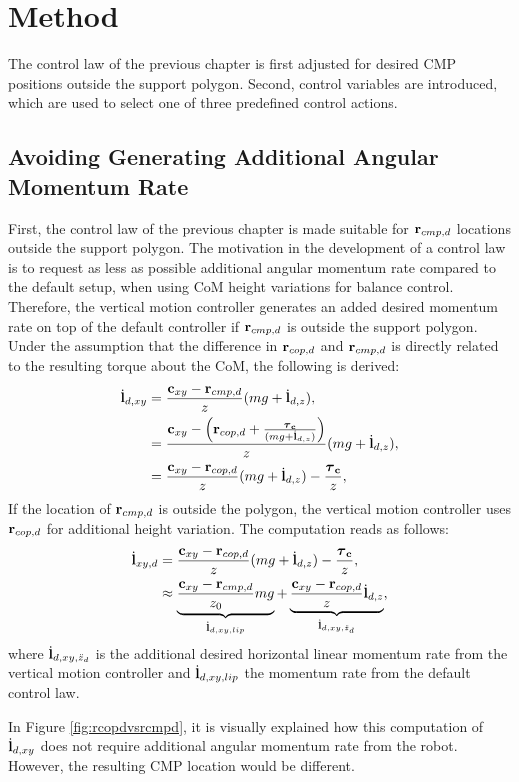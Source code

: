 \section{Method}
The control law of the previous chapter is first adjusted for desired \ac{CMP} positions outside the support polygon. Second, control variables are introduced, which are used to select one of three predefined control actions.

\subsection{Avoiding Generating Additional Angular Momentum Rate}
First, the control law of the previous chapter is made suitable for $\mathbf{r}_{cmp,d}$ locations outside the support polygon. The motivation in the development of a control law is to request as less as possible additional angular momentum rate compared to the default setup, when using \ac{CoM} height variations for balance control. Therefore, the vertical motion controller generates an added desired momentum rate on top of the default controller if $\mathbf{r}_{cmp,d}$ is outside the support polygon. Under the assumption that the difference in $\mathbf{r}_{cop,d}$ and $\mathbf{r}_{cmp,d}$ is directly related to the resulting torque about the \ac{CoM}, the following is derived:
\begin{align}
    \dot{\mathbf{l}}_{d,xy} &= \frac{\mathbf{c}_{xy}-\mathbf{r}_{cmp,d}}{z}(mg+\dot{\mathbf{l}}_{d,z}),\\
&=\frac{\mathbf{c}_{xy}-\Big(\mathbf{r}_{cop,d}+\frac{\boldsymbol{\tau}_{\mathbf{c}}}{(mg+\dot{\mathbf{l}}_{d,z})}\Big)}{z}(mg+\dot{\mathbf{l}}_{d,z}), \\
&=\frac{\mathbf{c}_{xy}-\mathbf{r}_{cop,d}}{z}(mg + \dot{\mathbf{l}}_{d,z})- \frac{\boldsymbol{\tau}_{\mathbf{c}}}{z},
\end{align}
If the location of $\mathbf{r}_{cmp,d}$ is outside the polygon, the vertical motion controller uses $\mathbf{r}_{cop,d}$ for additional height variation. The computation reads as follows:
 \begin{align}
\dot{\mathbf{l}}_{xy,d}&=\frac{\mathbf{c}_{xy}-\mathbf{r}_{cop,d}}{z}(mg+\dot{\mathbf{l}}_{d,z}) - \frac{\boldsymbol{\tau}_{\mathbf{c}}}{z},\\
&\approx \underbrace{ \frac{\mathbf{c}_{xy}-\mathbf{r}_{cmp,d}} {z_0}mg}_{\dot{\mathbf{l}}_{d,xy,lip}}  + \underbrace{\frac{\mathbf{c}_{xy}-\mathbf{r}_{cop,d}}{z}\dot{\mathbf{l}}_{d,z}}_{\dot{\mathbf{l}}_{d,xy,\ddot{z}_d}},
\end{align}
where $\dot{\mathbf{l}}_{d,xy,\ddot{z}_d}$ is the additional desired horizontal linear momentum rate from the vertical motion controller and $\dot{\mathbf{l}}_{d,xy,lip}$ the momentum rate from the default control law.

In Figure \ref{fig:rcopdvsrcmpd}, it is visually explained how this computation of $\dot{\mathbf{l}}_{d,xy}$ does not require additional angular momentum rate from the robot. However, the resulting \ac{CMP} location would be different.

